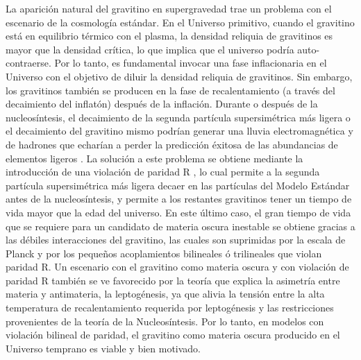 La aparición natural del gravitino en supergravedad trae un problema
con el escenario de la cosmología estándar. En el Universo primitivo,
cuando el gravitino está en equilibrio térmico con el plasma, la
densidad reliquia de gravitinos es mayor que la densidad crítica, lo
que implica que el universo podría auto-contraerse. Por lo tanto, es
fundamental invocar una fase inflacionaria en el Universo con el
objetivo de diluir la densidad reliquia de gravitinos. Sin embargo,
los gravitinos también se producen en la fase de recalentamiento (a
través del decaimiento del inflatón) después de la inflación. Durante
o después de la nucleosíntesis, el decaimiento de la segunda partícula
supersimétrica más ligera o el decaimiento del gravitino mismo podrían
generar una lluvia electromagnética y de hadrones que echarían a
perder la predicción éxitosa de las abundancias de elementos ligeros
\cite{Sarkar:1995dd}. La solución a este problema se obtiene mediante
la introducción de una violación de paridad R
\cite{Buchmuller:2007ui}, lo cual permite a la segunda partícula
supersimétrica más ligera decaer en las partículas del Modelo Estándar
antes de la nucleosíntesis, y permite a los restantes gravitinos tener
un tiempo de vida mayor que la edad del universo. En este último caso,
el gran tiempo de vida que se requiere para un candidato de materia
oscura inestable se obtiene gracias a las débiles interacciones del
gravitino, las cuales son suprimidas por la escala de Planck y por los
pequeños acoplamientos bilineales ó trilineales que violan paridad
R. Un escenario con el gravitino como materia oscura y con violación
de paridad R también se ve favorecido por la teoría que explica la
asimetría entre materia y antimateria, la leptogénesis, ya que alivia
la tensión entre la alta temperatura de recalentamiento requerida por
leptogénesis y las restricciones provenientes de la teoría de la
Nucleosíntesis. Por lo tanto, en modelos con violación bilineal de
paridad, el gravitino como materia oscura producido en el Universo
temprano es viable y bien motivado.

